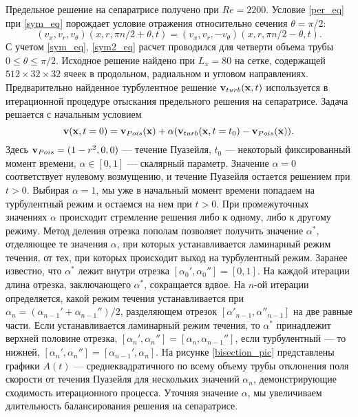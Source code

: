 Предельное решение на сепаратрисе получено при $Re=2200$. Условие \eqref{per_eq} при \eqref{sym_eq} порождает условие отражения относительно сечения $\theta = \pi/2$:
\begin{equation} \label{sym2_eq}
(v_x, v_r, v_\theta)(x, r, \pi n/2 + \theta, t) = (v_x, v_r, -v_\theta)(x, r, \pi n / 2 - \theta, t).
\end{equation}
С учетом \eqref{sym_eq}, \eqref{sym2_eq} расчет проводился для четверти объема трубы $0\leqslant\theta\leqslant\pi/2$. Исходное решение найдено при $L_x = 80$ на сетке, содержащей $512 \times 32 \times  32$ ячеек в продольном, радиальном и угловом направлениях. Предварительно найденное турбулентное решение $\mathbf{v}_{turb}(\mathbf{x},t)$ используется в итерационной процедуре отыскания предельного решения на сепаратрисе. Задача решается с начальным условием
\begin{equation} \label{edge_init_eq}
\mathbf{v}(\mathbf{x},t=0) = \mathbf{v}_{Pois}(\mathbf{x})+\alpha(\mathbf{v}_{turb}(\mathbf{x},t=t_0) - \mathbf{v}_{Pois}(\mathbf{x})).
\end{equation}
Здесь $\mathbf{v}_{Pois}=(1-r^2,0,0)$ --- течение Пуазейля, $t_0$ --- некоторый фиксированный момент времени, $\alpha \in [0,1]$ --- скалярный параметр. Значение $\alpha=0$ соответствует нулевому возмущению, и течение Пуазейля остается решением при $t>0$. Выбирая $\alpha=1$, мы уже в начальный момент времени попадаем на турбулентный режим и остаемся на нем при $t>0$. При промежуточных значениях $\alpha$ происходит стремление решения либо к одному, либо к другому режиму. Метод деления отрезка пополам позволяет получить значение $\alpha^*$, отделяющее те значения $\alpha$, при которых устанавливается ламинарный режим течения, от тех, при которых происходит выход на турбулентный режим. Заранее известно, что $\alpha^*$ лежит внутри отрезка $[\alpha_0', \alpha_0''] = [0,1]$. На каждой итерации длина отрезка, заключающего $\alpha^*$, сокращается вдвое. На $n$-ой итерации определяется, какой режим течения устанавливается при $\alpha_{n} = (\alpha_{n-1}' + \alpha_{n-1}'') / 2$, разделяющем отрезок $[\alpha'_{n-1}, \alpha''_{n-1}]$ на две равные части. Если устанавливается ламинарный режим течения, то $\alpha^*$ принадлежит верхней половине отрезка, $[\alpha_{n}', \alpha_{n}''] = [\alpha_{n}, \alpha_{n-1}'']$, если турбулентный --- то нижней, $[\alpha_{n}', \alpha_{n}''] = [\alpha_{n-1}', \alpha_{n}]$. На рисунке \ref{bisection_pic} представлены графики $A(t)$ --- среднеквадратичного по всему объему трубы отклонения поля скорости от течения Пуазейля для нескольких значений $\alpha_n$, демонстрирующие сходимость итерационного процесса. Уточняя значение $\alpha$, мы увеличиваем длительность балансирования решения на сепаратрисе. 


